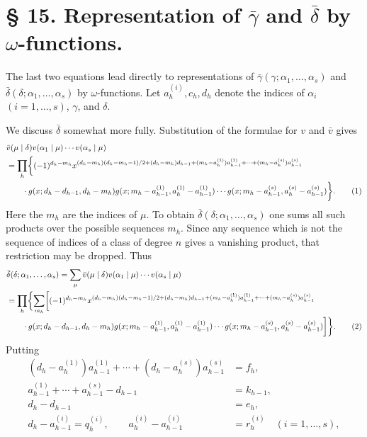 \section*{§ 15. Representation of $\bar\gamma$ and $\bar\delta$ by $\omega$-functions.}

The last two equations lead directly to representations of $\bar\gamma(\gamma;\alpha_1,
\ldots,\alpha_s)$ and $\bar\delta(\delta;\alpha_1,
\ldots,\alpha_s)$ by $\omega$-functions. Let $a_h^{(i)},c_h,d_h$ denote the indices of $\alpha_i$ $(i=1,
\ldots,s)$, $\gamma$, and $\delta$.

We discuss $\bar\delta$ somewhat more fully. Substitution of the formulae for $v$ and $\bar v$ gives
\begin{align}
&\bar v(\mu\mid\delta)v(\alpha_1\mid\mu)\cdots v(\alpha_s\mid\mu)\notag\\
&=\prod_h\biggl\{(-1)^{d_h-m_h}
 x^{(d_h-m_h)(d_h-m_h-1)/2+(d_h-m_h)d_{h-1}+(m_h-a_h^{(1)})a_{h-1}^{(1)}+\cdots+(m_h-a_h^{(s)})a_{h-1}^{(s)}}
\notag\\
&\qquad\cdot g(x;d_h-d_{h-1},d_h-m_h)g(x;m_h-a_{h-1}^{(1)},a_h^{(1)}-a_{h-1}^{(1)})
\cdots g(x;m_h-a_{h-1}^{(s)},a_h^{(s)}-a_{h-1}^{(s)})\biggr\}.
\tag{1}
\end{align}
Here the $m_h$ are the indices of $\mu$. To obtain $\bar\delta(\delta;\alpha_1,
\ldots,\alpha_s)$ one sums all such products over the possible sequences $m_h$. Since any sequence which is not the sequence of indices of a class of degree $n$ gives a vanishing product, that restriction may be dropped. Thus
\begin{align}
&\bar\delta(\delta;\alpha_1,\ldots,\alpha_s)
 =\sum_\mu \bar v(\mu\mid\delta)v(\alpha_1\mid\mu)\cdots v(\alpha_s\mid\mu)\notag\\
&=\prod_h\biggl\{\sum_{m_h}\biggl[(-1)^{d_h-m_h}
 x^{(d_h-m_h)(d_h-m_h-1)/2+(d_h-m_h)d_{h-1}+(m_h-a_h^{(1)})a_{h-1}^{(1)}+\cdots+(m_h-a_h^{(s)})a_{h-1}^{(s)}}\notag\\
&\qquad\cdot g(x;d_h-d_{h-1},d_h-m_h)g(x;m_h-a_{h-1}^{(1)},a_h^{(1)}-a_{h-1}^{(1)})\cdots g(x;m_h-a_{h-1}^{(s)},a_h^{(s)}-a_{h-1}^{(s)})\biggr]\biggr\}.
\tag{2}
\end{align}
Putting
\begin{align}
(d_h-a_h^{(1)})a_{h-1}^{(1)}+\cdots+(d_h-a_h^{(s)})a_{h-1}^{(s)}&=f_h,
\tag{3}\\
a_{h-1}^{(1)}+\cdots+a_{h-1}^{(s)}-d_{h-1}&=k_{h-1},
\tag{4}\\
d_h-d_{h-1}&=e_h,
\tag{5}\\
d_h-a_{h-1}^{(i)}=q_h^{(i)},\qquad a_h^{(i)}-a_{h-1}^{(i)}&=r_h^{(i)}\quad(i=1,\ldots,s),
\tag{6}
\end{align}

